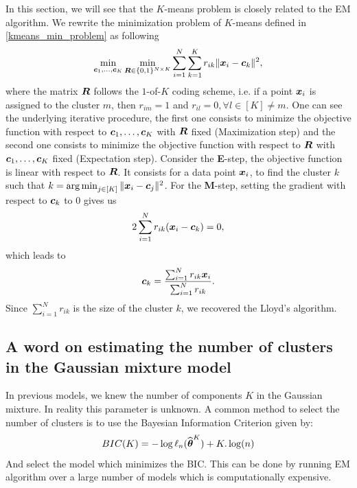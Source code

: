 In this section, we will see that the $K$-means problem is closely related to the EM algorithm. We rewrite the minimization problem of $K$-means defined in \cref{kmeans_min_problem} as following
\begin{equation}
  \min_{\boldsymbol c_1,\dots,\boldsymbol c_K}\min_{\boldsymbol R \in \{0,1\}^{N\times K}}\sum_{i=1}^N\sum_{k=1}^K r_{ik}\|\boldsymbol x_i - \boldsymbol c_k \|^2,
\end{equation}
where the matrix $\boldsymbol R$ follows the $1$-of-$K$ coding scheme, i.e. if a point $\boldsymbol x_i$ is assigned to the cluster $m$, then $r_{im}=1$ and $r_{il}=0, \forall l\in [K] \neq m$. One can see the underlying iterative procedure, the first one consists to minimize the objective function with respect to $\boldsymbol c_1,\dots,\boldsymbol c_K$ with $\boldsymbol R$ fixed (Maximization step) and the second one consists to minimize the objective function with respect to $\boldsymbol R$ with $\boldsymbol c_1,\dots,\boldsymbol c_K$ fixed (Expectation step). Consider the \textbf{E}-step, the objective function is linear with respect to $\boldsymbol R$.  It consists for a data point $\boldsymbol x_i$, to find the cluster $k$ such that $k = \operatorname*{arg\,min}_{j\in[K]}\|\boldsymbol x_i-\boldsymbol c_j\|^2$. For the \textbf{M}-step, setting the gradient with respect to $\boldsymbol c_k$ to 0 gives us
\begin{equation}
  2\sum_{i=1}^N r_{ik} (\boldsymbol x_i-\boldsymbol c_k) = 0,
\end{equation}
which leads to
\begin{equation}
  \boldsymbol c_k = \frac{\sum_{i=1}^N r_{ik}\boldsymbol x_i}{\sum_{i=1}^N r_{ik}}.
\end{equation}
Since $\sum_{i=1}^Nr_{ik}$ is the size of the cluster $k$, we recovered the Lloyd's algorithm.

\subsection{A word on estimating the number of clusters in the Gaussian mixture model}
In previous models, we knew the number of components $K$ in the Gaussian mixture. In reality this parameter is unknown. A common method to select the number of clusters is to use the Bayesian Information Criterion given by:
\begin{equation}
  BIC(K) = -\log\ell_n(\widehat{{\boldsymbol\theta}}^K)+K.\log(n)
\end{equation}
And select the model which minimizes the BIC. This can be done by running EM algorithm over a large number of models which is computationally expensive.
